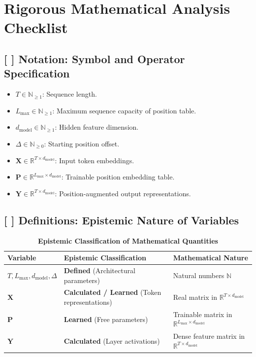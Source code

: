 \documentclass[11pt,a4paper]{article}
\theoremstyle{definition}
\begin{document}
\section{Rigorous Mathematical Analysis Checklist}

\subsection{[ ] Notation: Symbol and Operator Specification}
\begin{itemize}
    \item $T \in \mathbb{N}_{\ge 1}$: Sequence length.
    \item $L_{\text{max}} \in \mathbb{N}_{\ge 1}$: Maximum sequence capacity of position table.
    \item $d_{\text{model}} \in \mathbb{N}_{\ge 1}$: Hidden feature dimension.
    \item $\Delta \in \mathbb{N}_{\ge 0}$: Starting position offset.
    \item $\mathbf{X} \in \mathbb{R}^{T \times d_{\text{model}}}$: Input token embeddings.
    \item $\mathbf{P} \in \mathbb{R}^{L_{\text{max}} \times d_{\text{model}}}$: Trainable position embedding table.
    \item $\mathbf{Y} \in \mathbb{R}^{T \times d_{\text{model}}}$: Position-augmented output representations.
\end{itemize}

\subsection{[ ] Definitions: Epistemic Nature of Variables}
\begin{table}[h]
\centering
\caption{\textbf{Epistemic Classification of Mathematical Quantities}}
\begin{tabular}{lll}
\toprule
\textbf{Variable} & \textbf{Epistemic Classification} & \textbf{Mathematical Nature} \\
\midrule
$T, L_{\text{max}}, d_{\text{model}}, \Delta$ & \textbf{Defined} (Architectural parameters) & Natural numbers $\mathbb{N}$ \\
$\mathbf{X}$ & \textbf{Calculated / Learned} (Token representations) & Real matrix in $\mathbb{R}^{T \times d_{\text{model}}}$ \\
$\mathbf{P}$ & \textbf{Learned} (Free parameters) & Trainable matrix in $\mathbb{R}^{L_{\text{max}} \times d_{\text{model}}}$ \\
$\mathbf{Y}$ & \textbf{Calculated} (Layer activations) & Dense feature matrix in $\mathbb{R}^{T \times d_{\text{model}}}$ \\
\bottomrule
\end{tabular}
\end{table}
\end{document}
